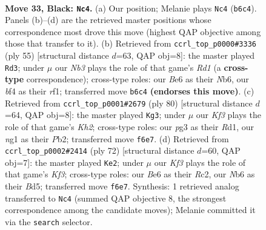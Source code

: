 \documentclass[11pt]{article}
\begin{document}
\clearpage

\begin{figure}[p]\centering
\begin{subfigure}{0.46\textwidth}\centering
\resizebox{\linewidth}{!}{%
\newchessgame
\chessboard[
  setfen={5r2/r7/pnB1bkp1/p4p1p/5B2/P4PP1/1P5P/RK1R2N1 b - - 3 33},
  showmover=false,
  pgfstyle=straightmove, color=movearrow, markmove={b6-c4}
]}
\caption{}
\end{subfigure}\hfill
\begin{subfigure}{0.46\textwidth}\centering
\resizebox{\linewidth}{!}{%
\newchessgame
\chessboard[
  setfen={3r4/p7/1np2rkp/5pp1/8/1BP2PP1/P3R1KP/5R2 b - - 0 28},
  showmover=false,
  pgfstyle=straightmove, color=movearrow, markmove={d8-d3}
]}
\caption{}
\end{subfigure}
\\[4pt]
\begin{subfigure}{0.46\textwidth}\centering
\resizebox{\linewidth}{!}{%
\newchessgame
\chessboard[
  setfen={5rk1/1p3p2/4r1p1/pB1p2P1/P3bB1R/1nP4P/1P5K/3R4 w - - 3 41},
  showmover=false,
  pgfstyle=straightmove, color=movearrow, markmove={h2-g3}
]}
\caption{}
\end{subfigure}\hfill
\begin{subfigure}{0.46\textwidth}\centering
\resizebox{\linewidth}{!}{%
\newchessgame
\chessboard[
  setfen={5r2/p3r2k/3p1p1p/2pBb3/4P1P1/1P3K1P/P1R5/5R2 w - - 0 37},
  showmover=false,
  pgfstyle=straightmove, color=movearrow, markmove={f3-e2}
]}
\caption{}
\end{subfigure}
\caption{\textbf{Move 33, Black: \texttt{Nc4}.} (a) Our position; Melanie plays \texttt{Nc4} (\texttt{b6c4}). Panels (b)--(d) are the retrieved master positions whose correspondence most drove this move (highest QAP objective among those that transfer to it). (b) Retrieved from \texttt{ccrl\_top\_p0000\#3336} (ply 55) [structural distance $d$=63, QAP obj=8]: the master played \texttt{Rd3}; under $\mu$ our \emph{Nb3} plays the role of that game's \emph{Rd1} (a \textbf{cross-type} correspondence); cross-type roles: our \emph{B}e6 as their \emph{N}b6, our \emph{b}f4 as their \emph{r}f1; transferred move \texttt{b6c4} \textbf{(endorses this move)}. (c) Retrieved from \texttt{ccrl\_top\_p0001\#2679} (ply 80) [structural distance $d$=64, QAP obj=8]: the master played \texttt{Kg3}; under $\mu$ our \emph{Kf3} plays the role of that game's \emph{Kh2}; cross-type roles: our \emph{p}g3 as their \emph{R}d1, our \emph{n}g1 as their \emph{P}b2; transferred move \texttt{f6e7}. (d) Retrieved from \texttt{ccrl\_top\_p0002\#2414} (ply 72) [structural distance $d$=60, QAP obj=7]: the master played \texttt{Ke2}; under $\mu$ our \emph{Kf3} plays the role of that game's \emph{Kf3}; cross-type roles: our \emph{B}e6 as their \emph{R}c2, our \emph{N}b6 as their \emph{B}d5; transferred move \texttt{f6e7}. Synthesis: 1 retrieved analog transferred to \texttt{Nc4} (summed QAP objective 8, the strongest correspondence among the candidate moves); Melanie committed it via the \texttt{search} selector.}
\label{fig:thought-m65}
\end{figure}
\end{document}
